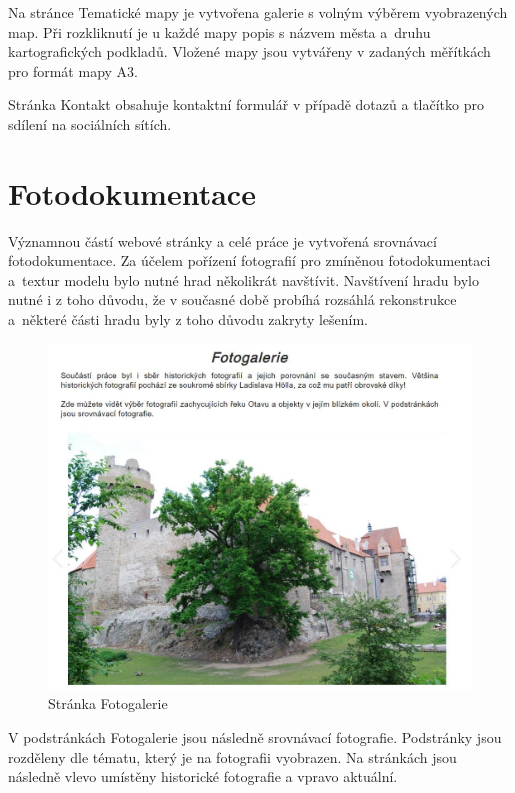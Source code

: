 \documentclass[thesis=M,czech]{FITthesis}[2012/06/26]
\begin{document}
Na stránce Tematické mapy je vytvořena galerie s volným výběrem vyobrazených map. Při rozkliknutí je u každé mapy popis s názvem města a~druhu kartografických podkladů. Vložené mapy jsou vytvářeny v zadaných měřítkách pro formát mapy A3. 

Stránka Kontakt obsahuje kontaktní formulář v případě dotazů a tlačítko pro sdílení na sociálních sítích. 


\section{Fotodokumentace}
Významnou částí webové stránky a celé práce je vytvořená srovnávací fotodokumentace. Za účelem pořízení fotografií pro zmíněnou fotodokumentaci a~textur modelu bylo nutné hrad několikrát navštívit. Navštívení hradu bylo nutné i z toho důvodu, že v současné době probíhá rozsáhlá rekonstrukce a~některé části hradu byly z toho důvodu zakryty lešením. 

\begin{figure}[h!]
	\centering
	\includegraphics[width=14cm]{pics/fotogalerie.jpg}
	\caption{Stránka Fotogalerie}
	\label{obrazek:fotoga}
\end{figure}

V podstránkách Fotogalerie jsou následně srovnávací fotografie. Podstránky jsou rozděleny dle tématu, který je na fotografii vyobrazen. Na stránkách jsou následně vlevo umístěny historické fotografie a vpravo aktuální.
\end{document}
